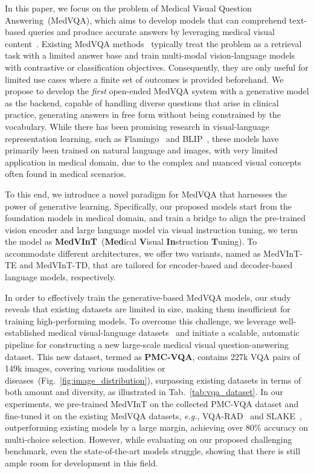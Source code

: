 \documentclass{article}
\begin{document}
In this paper, we focus on the problem of Medical Visual Question Answering~(MedVQA), 
which aims to develop models that can comprehend text-based queries and produce accurate answers by leveraging medical visual content~\cite{lin2022medical}. 
Existing MedVQA methods~\cite{nguyen2019overcoming,liu2021contrastive,chen2022multi,lin2023pmcclip} typically treat the problem as a retrieval task with a limited answer base and train multi-modal vision-language models with contrastive or classification objectives. Consequently, they are only useful for limited use cases where a finite set of outcomes is provided beforehand. 
We propose to develop the {\em first} open-ended MedVQA system with a generative model as the backend, capable of handling diverse questions that arise in clinical practice, generating answers in free form without being constrained by the vocabulary. While there has been promising research in visual-language representation learning, such as Flamingo~\cite{alayrac2022flamingo} and BLIP~\cite{li2023blip}, these models have primarily been trained on natural language and images,
with very limited application in medical domain, 
due to the complex and nuanced visual concepts often found in medical scenarios.



To this end, we introduce a novel paradigm for MedVQA that harnesses the power of generative learning. 
Specifically, our proposed models start from the foundation models in medical domain, and train a bridge to align the pre-trained vision encoder and large language model via visual instruction tuning, we term the model as \textbf{MedVInT}~(\textbf{Med}ical \textbf{V}isual \textbf{In}struction \textbf{T}uning). 
To accommodate different architectures, we offer two variants, named as MedVInT-TE and MedVInT-TD, that are tailored for encoder-based and decoder-based language models, respectively. 

In order to effectively train the generative-based MedVQA models, 
our study reveals that existing datasets are limited in size, 
making them insufficient for training high-performing models.
To overcome this challenge, we leverage well-established medical visual-language datasets~\cite{lin2023pmcclip} and initiate a scalable, automatic pipeline for constructing a new large-scale medical visual question-answering dataset.
This new dataset, termed as {\bf PMC-VQA}, 
contains 227k VQA pairs of 149k images, 
covering various modalities or diseases~(Fig.~\ref{fig:image_distribution}), surpassing existing datasets in terms of both amount and diversity, 
as illustrated in Tab.~\ref{tab:vqa_dataset}. 
In our experiments, we pre-trained MedVInT on the collected PMC-VQA dataset and fine-tuned it on the existing MedVQA datasets, 
{\em e.g.}, VQA-RAD~\cite{lau2018dataset} and SLAKE~\cite{liu2021slake}, outperforming existing models by a large margin, 
achieving over 80\% accuracy on multi-choice selection. 
However, while evaluating on our proposed challenging benchmark, 
even the state-of-the-art models struggle, showing that there is still ample room for development in this field.
\end{document}
